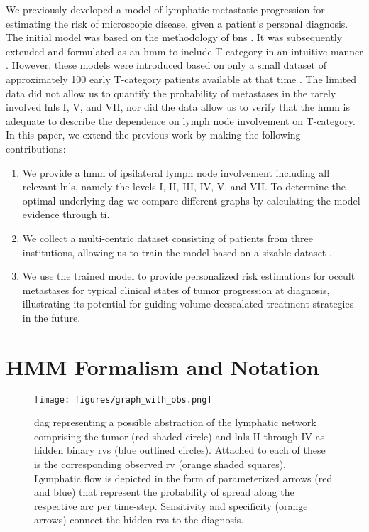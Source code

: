 \documentclass[twocolumn]{article}
\begin{document}
We previously developed a model of lymphatic metastatic progression for estimating the risk of microscopic disease, given a patient's personal diagnosis. The initial model was based on the methodology of \glspl{bn} \cite{pouymayou_bayesian_2019}. It was subsequently extended and formulated as an \gls{hmm} to include T-category in an intuitive manner \cite{ludwig_hidden_2021}. However, these models were introduced based on only a small dataset of approximately 100 early T-category patients available at that time \cite{sanguineti_defining_2009}. The limited data did not allow us to quantify the probability of metastases in the rarely involved \glspl{lnl} I, V, and VII, nor did the data allow us to verify that the \gls{hmm} is adequate to describe the dependence on lymph node involvement on T-category. In this paper, we extend the previous work \cite{ludwig_hidden_2021} by making the following contributions:
\begin{enumerate}
    \item We provide a \gls{hmm} of ipsilateral lymph node involvement including all relevant \glspl{lnl}, namely the levels I, II, III, IV, V, and VII. To determine the optimal underlying \gls{dag} we compare different graphs by calculating the model evidence through \gls{ti}.
    \item We collect a multi-centric dataset consisting of patients from three institutions, allowing us to train the model based on a sizable dataset \cite{ludwig_dataset_2022,ludwig_multi-centric_2023}.
    \item We use the trained model to provide personalized risk estimations for occult metastases for typical clinical states of tumor progression at diagnosis, illustrating its potential for guiding volume-deescalated treatment strategies in the future. 
\end{enumerate}



\section{HMM Formalism and Notation}
\label{sec:formalism}


\begin{figure}
    \centering
    \texttt{[image: figures/graph\_with\_obs.png]}
    \caption{\Gls{dag} representing a possible abstraction of the lymphatic network comprising the tumor (red shaded circle) and \glspl{lnl} II through IV as hidden binary \glspl{rv} (blue outlined circles). Attached to each of these is the corresponding observed \gls{rv} (orange shaded squares). Lymphatic flow is depicted in the form of parameterized arrows (red and blue) that represent the probability of spread along the respective arc per time-step. Sensitivity and specificity (orange arrows) connect the hidden \glspl{rv} to the diagnosis. \label{fig:graph_with_obs}}
\end{figure}
\end{document}
